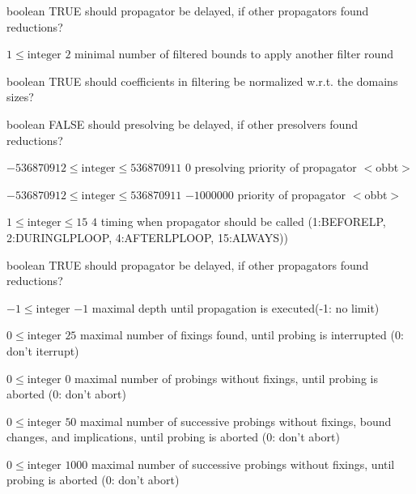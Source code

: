 %
{boolean}%
{TRUE}%
{should propagator be delayed, if other propagators found reductions?}%
{}

%
{$1\leq\textrm{integer}$}%
{$2$}%
{minimal number of filtered bounds to apply another filter round}%
{}

%
{boolean}%
{TRUE}%
{should coefficients in filtering be normalized w.r.t. the domains sizes?}%
{}

%
{boolean}%
{FALSE}%
{should presolving be delayed, if other presolvers found reductions?}%
{}

%
{$-536870912\leq\textrm{integer}\leq536870911$}%
{$0$}%
{presolving priority of propagator $<$obbt$>$}%
{}

%
{$-536870912\leq\textrm{integer}\leq536870911$}%
{$-1000000$}%
{priority of propagator $<$obbt$>$}%
{}

%
{$1\leq\textrm{integer}\leq15$}%
{$4$}%
{timing when propagator should be called (1:BEFORELP, 2:DURINGLPLOOP, 4:AFTERLPLOOP, 15:ALWAYS))}%
{}

%
{boolean}%
{TRUE}%
{should propagator be delayed, if other propagators found reductions?}%
{}

%
{$-1\leq\textrm{integer}$}%
{$-1$}%
{maximal depth until propagation is executed(-1: no limit)}%
{}

%
{$0\leq\textrm{integer}$}%
{$25$}%
{maximal number of fixings found, until probing is interrupted (0: don't iterrupt)}%
{}

%
{$0\leq\textrm{integer}$}%
{$0$}%
{maximal number of probings without fixings, until probing is aborted (0: don't abort)}%
{}

%
{$0\leq\textrm{integer}$}%
{$50$}%
{maximal number of successive probings without fixings, bound changes, and implications, until probing is aborted (0: don't abort)}%
{}

%
{$0\leq\textrm{integer}$}%
{$1000$}%
{maximal number of successive probings without fixings, until probing is aborted (0: don't abort)}%
{}

